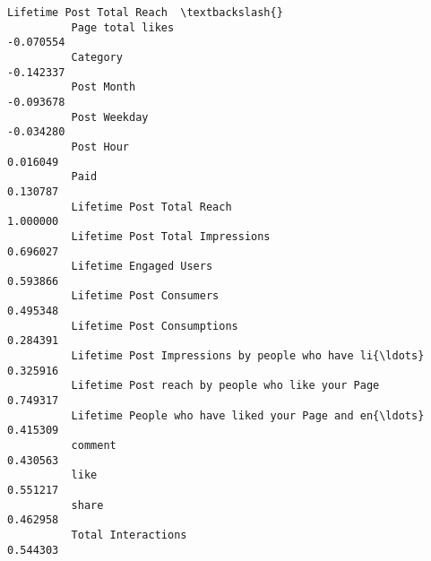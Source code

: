 \documentclass[11pt]{article}
\begin{document}
\begin{Verbatim}[commandchars=\\\{\}]
                                                              Lifetime Post Total Reach  \textbackslash{}
          Page total likes                                                    -0.070554   
          Category                                                            -0.142337   
          Post Month                                                          -0.093678   
          Post Weekday                                                        -0.034280   
          Post Hour                                                            0.016049   
          Paid                                                                 0.130787   
          Lifetime Post Total Reach                                            1.000000   
          Lifetime Post Total Impressions                                      0.696027   
          Lifetime Engaged Users                                               0.593866   
          Lifetime Post Consumers                                              0.495348   
          Lifetime Post Consumptions                                           0.284391   
          Lifetime Post Impressions by people who have li{\ldots}                   0.325916   
          Lifetime Post reach by people who like your Page                     0.749317   
          Lifetime People who have liked your Page and en{\ldots}                   0.415309   
          comment                                                              0.430563   
          like                                                                 0.551217   
          share                                                                0.462958   
          Total Interactions                                                   0.544303   
          

\end{Verbatim}
\end{document}

